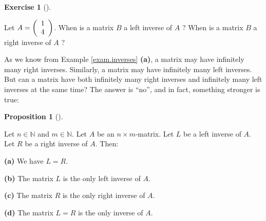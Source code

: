 \documentclass[numbers=enddot,12pt,final,onecolumn,notitlepage]{scrartcl}%
\theoremstyle{definition}
\newtheorem{prop}[theo]{Proposition}
\newenvironment{proposition}[1][]
{\begin{prop}[#1]\begin{leftbar}}
{\end{leftbar}\end{prop}}
\newtheorem{exmp}[theo]{Exercise}
\newenvironment{exercise}[1][]
{\begin{exmp}[#1]\begin{leftbar}}
{\end{leftbar}\end{exmp}}
\begin{document}
\begin{exercise}
\label{exe.exam.inverses}Let $A=\left(
\begin{array}
[c]{c}%
1\\
4
\end{array}
\right)  $. When is a matrix $B$ a left inverse of $A$ ? When is a matrix $B$
a right inverse of $A$ ?
\end{exercise}

As we know from Example \ref{exam.inverses} \textbf{(a)}, a matrix may have
infinitely many right inverses. Similarly, a matrix may have infinitely many
left inverses. But can a matrix have both infinitely many right inverses and
infinitely many left inverses at the same time? The answer is
\textquotedblleft no\textquotedblright, and in fact, something stronger is true:

\begin{proposition}
\label{prop.inverses.L=R}Let $n\in\mathbb{N}$ and $m\in\mathbb{N}$. Let $A$ be
an $n\times m$-matrix. Let $L$ be a left inverse of $A$. Let $R$ be a right
inverse of $A$. Then:

\textbf{(a)} We have $L=R$.

\textbf{(b)} The matrix $L$ is the only left inverse of $A$.

\textbf{(c)} The matrix $R$ is the only right inverse of $A$.

\textbf{(d)} The matrix $L=R$ is the only inverse of $A$.
\end{proposition}
\end{document}
